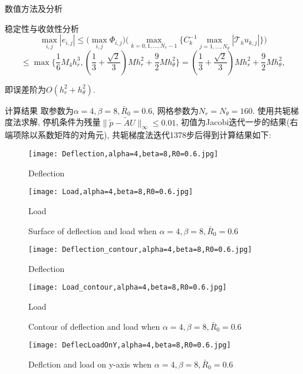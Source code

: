 \documentclass{article}
\begin{document}
\begin{section}{数值方法及分析}
\begin{subsection}{稳定性与收敛性分析}
        $$\max_{i,j}|e_{i,j}|\leq \big(\max_{i,j}\Phi_{i,j}\big)\bigg(\max_{k=0,1,...,N_r-1}\big\{ C_k^{-1}\max_{j=1,...,N_\theta}|\mathcal{T}_h u_{k,j}|\big\} \bigg)$$
        $$\leq \max\{\frac{1}{6}M_4h_r^3,(\frac{1}{3}+\frac{\sqrt{2}}{3})Mh_r^2 + \frac{9}{2}Mh_\theta^2\} = (\frac{1}{3}+\frac{\sqrt{2}}{3})Mh_r^2 + \frac{9}{2}Mh_\theta^2, $$

        即误差阶为$O(h_r^2+h_\theta^2)$. 
    \end{subsection}
\end{section}

\begin{section}{计算结果}
取参数为$\alpha=4,\beta=8,\bar{R}_0=0.6$, 网格参数为$N_r=N_\theta=160$. 使用共轭梯度法求解, 停机条件为残量$\|\tilde{p}-\tilde{A}U\|_\infty\leq 0.01$, 初值为Jacobi迭代一步的结果(右端项除以系数矩阵的对角元),
共轭梯度法迭代1378步后得到计算结果如下:
\begin{figure}[htbp]
\begin{minipage}[t]{0.35\linewidth}
\centering
\texttt{[image: Deflection,alpha=4,beta=8,R0=0.6.jpg]}
\caption{Deflection}
\end{minipage}%
\hfill
\begin{minipage}[t]{0.5\linewidth}
\centering
\texttt{[image: Load,alpha=4,beta=8,R0=0.6.jpg]}
\caption{Load}
\end{minipage}
\caption{Surface of deflection and load when $\alpha=4,\beta=8,\bar{R}_0=0.6$}
\end{figure}

\begin{figure}[htbp]
\begin{minipage}[t]{0.35\linewidth}
\centering
\texttt{[image: Deflection\_contour,alpha=4,beta=8,R0=0.6.jpg]}
\caption{Deflection}
\end{minipage}%
\hfill
\begin{minipage}[t]{0.5\linewidth}
\centering
\texttt{[image: Load\_contour,alpha=4,beta=8,R0=0.6.jpg]}
\caption{Load}
\end{minipage}
\caption{Contour of deflection and load when $\alpha=4,\beta=8,\bar{R}_0=0.6$}
\end{figure}

\begin{figure}[!htbp]
    \centering
    \texttt{[image: DeflecLoadOnY,alpha=4,beta=8,R0=0.6.jpg]}
    \caption{Deflction and load on y-axis when $\alpha=4,\beta=8,\bar{R}_0=0.6$}
\end{figure}


\end{section}
\end{document}
